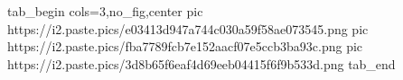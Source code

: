  
 
 
 
 

\ifcmt
  tab_begin cols=3,no_fig,center
     pic https://i2.paste.pics/e03413d947a744c030a59f58ae073545.png
     pic https://i2.paste.pics/fba7789fcb7e152aacf07e5ccb3ba93c.png
     pic https://i2.paste.pics/3d8b65f6eaf4d69eeb04415f6f9b533d.png
  tab_end
\fi
